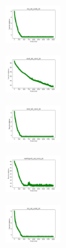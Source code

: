 \vspace*{\fill}
\newpage
\vspace*{\fill}

\begin{figure}[H]
    \centering
    \begin{subfigure}
        \centering
        \includegraphics[width=0.234\textwidth]{img/aggun/iris_set_const_20_949004259_cost.png}
    \end{subfigure}
    \hfill
    \begin{subfigure}
        \centering
        \includegraphics[width=0.234\textwidth]{img/aggun/ecoli_set_const_20_949004259_cost.png}
    \end{subfigure}
    \hfill
    \begin{subfigure}
        \centering
        \includegraphics[width=0.234\textwidth]{img/aggun/rand_set_const_20_949004259_cost.png}
    \end{subfigure}
    \hfill
    \begin{subfigure}
        \centering
        \includegraphics[width=0.234\textwidth]{img/aggun/newthyroid_set_const_20_949004259_cost.png}
    \end{subfigure}
    \hfill
    \begin{subfigure}
        \centering
        \includegraphics[width=0.234\textwidth]{img/aggun/iris_set_const_20_589741062_cost.png}

\end{subfigure}
\end{figure}
